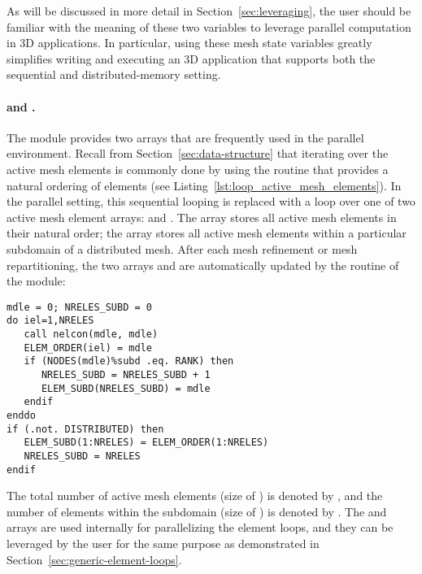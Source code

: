 As will be discussed in more detail in Section~\ref{sec:leveraging}, the user should be familiar with the meaning of these two variables to leverage parallel computation in \hp3D applications. In particular, using these mesh state variables greatly simplifies writing and executing an \hp3D application that supports both the sequential and distributed-memory setting.

\paragraph{ and .}
The  module provides two arrays that are frequently used in the parallel environment. Recall from Section~\ref{sec:data-structure} that iterating over the active mesh elements is commonly done by using the  routine that provides a natural ordering of elements (see Listing~\ref{lst:loop_active_mesh_elements}). In the parallel setting, this sequential looping is replaced with a loop over one of two active mesh element arrays:  and . The  array stores all active mesh elements in their natural order; the  array stores all active mesh elements within a particular subdomain of a distributed mesh. After each mesh refinement or mesh repartitioning, the two arrays  and  are automatically updated by the  routine of the  module:

\begin{lstlisting}[caption=Updating the data structure arrays \var{ELEM\_ORDER} and \var{ELEM\_SUBD}., label={lst:update_elem_order}]
mdle = 0; NRELES_SUBD = 0
do iel=1,NRELES
   call nelcon(mdle, mdle)
   ELEM_ORDER(iel) = mdle
   if (NODES(mdle)%subd .eq. RANK) then
      NRELES_SUBD = NRELES_SUBD + 1
      ELEM_SUBD(NRELES_SUBD) = mdle
   endif
enddo
if (.not. DISTRIBUTED) then
   ELEM_SUBD(1:NRELES) = ELEM_ORDER(1:NRELES)
   NRELES_SUBD = NRELES
endif
\end{lstlisting}

The total number of active mesh elements (size of ) is denoted by , and the number of elements within the subdomain (size of ) is denoted by . The  and  arrays are used internally for parallelizing the element loops, and they can be leveraged by the user for the same purpose as demonstrated in Section~\ref{sec:generic-element-loops}.

